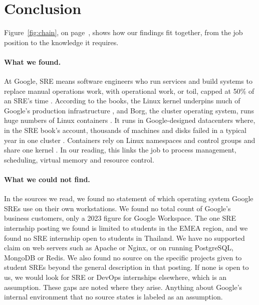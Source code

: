 \section{Conclusion}\label{sec:conclusion}

Figure~\ref{fig:chain}, on page~\pageref{fig:chain}, shows how our findings fit together, from the job position to the knowledge it requires.

\paragraph{What we found.}
At Google, SRE means software engineers who run services and build systems to replace manual operations work, with operational work, or toil, capped at 50\% of an SRE's time \cite{sre-book,workbook}. According to the books, the Linux kernel underpins much of Google's production infrastructure \cite{bsrs}, and Borg, the cluster operating system, runs huge numbers of Linux containers \cite{sre-book,workbook}. It runs in Google-designed datacenters where, in the SRE book's account, thousands of machines and disks failed in a typical year in one cluster \cite{sre-book}. Containers rely on Linux namespaces and control groups and share one kernel \cite{man7,kernel-docs,docs-docker-get-started-docker-concepts-the-basics-what-is-a-container}. In our reading, this links the job to process management, scheduling, virtual memory and resource control.

\paragraph{What we could not find.}
In the sources we read, we found no statement of which operating system Google SREs use on their own workstations. We found no total count of Google's business customers, only a 2023 figure for Google Workspace. The one SRE internship posting we found is limited to students in the EMEA region, and we found no SRE internship open to students in Thailand. We have no supported claim on web servers such as Apache or Nginx, or on running PostgreSQL, MongoDB or Redis. We also found no source on the specific projects given to student SREs beyond the general description in that posting. If none is open to us, we would look for SRE or DevOps internships elsewhere, which is an assumption. These gaps are noted where they arise. Anything about Google's internal environment that no source states is labeled as an assumption.

